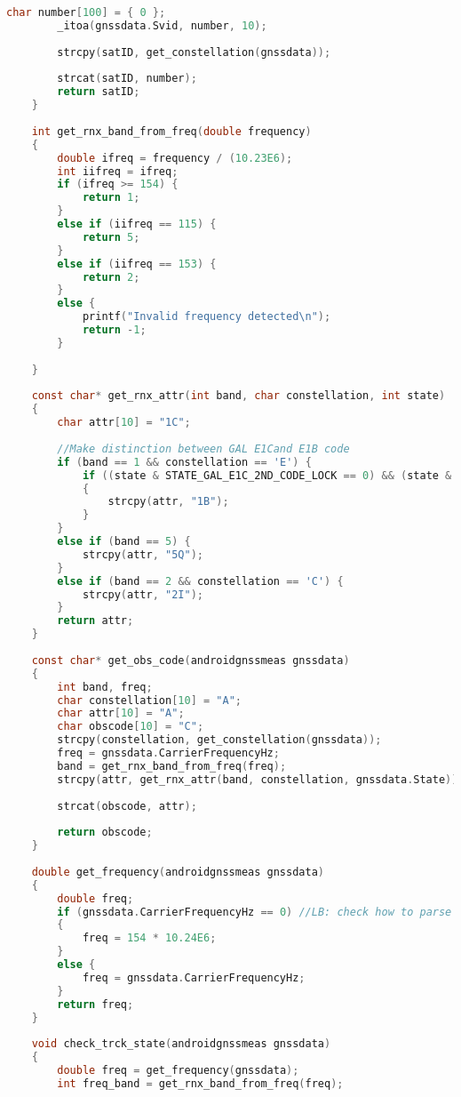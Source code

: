 \begin{lstlisting}[language=c]
		char number[100] = { 0 };
		_itoa(gnssdata.Svid, number, 10);
		
		strcpy(satID, get_constellation(gnssdata));
		
		strcat(satID, number);
		return satID;
	}
	
	int get_rnx_band_from_freq(double frequency)
	{
		double ifreq = frequency / (10.23E6);
		int iifreq = ifreq;
		if (ifreq >= 154) {
			return 1;
		}
		else if (iifreq == 115) {
			return 5;
		}
		else if (iifreq == 153) {
			return 2;
		}
		else {
			printf("Invalid frequency detected\n");
			return -1;
		}
		
	}
	
	const char* get_rnx_attr(int band, char constellation, int state)
	{
		char attr[10] = "1C";
		
		//Make distinction between GAL E1Cand E1B code
		if (band == 1 && constellation == 'E') {
			if ((state & STATE_GAL_E1C_2ND_CODE_LOCK == 0) && (state & STATE_GAL_E1B_PAGE_SYNC != 0))
			{
				strcpy(attr, "1B");
			}
		}
		else if (band == 5) {
			strcpy(attr, "5Q");
		}
		else if (band == 2 && constellation == 'C') {
			strcpy(attr, "2I");
		}
		return attr;
	}
	
	const char* get_obs_code(androidgnssmeas gnssdata)
	{
		int band, freq;
		char constellation[10] = "A";
		char attr[10] = "A";
		char obscode[10] = "C";
		strcpy(constellation, get_constellation(gnssdata));
		freq = gnssdata.CarrierFrequencyHz;
		band = get_rnx_band_from_freq(freq);
		strcpy(attr, get_rnx_attr(band, constellation, gnssdata.State));
		
		strcat(obscode, attr);
		
		return obscode;
	}
	
	double get_frequency(androidgnssmeas gnssdata)
	{
		double freq;
		if (gnssdata.CarrierFrequencyHz == 0) //LB: check how to parse null values: not sure this case will ever happen
		{
			freq = 154 * 10.24E6;
		}
		else {
			freq = gnssdata.CarrierFrequencyHz;
		}
		return freq;
	}
	
	void check_trck_state(androidgnssmeas gnssdata)
	{
		double freq = get_frequency(gnssdata);
		int freq_band = get_rnx_band_from_freq(freq);
		

\end{lstlisting}

